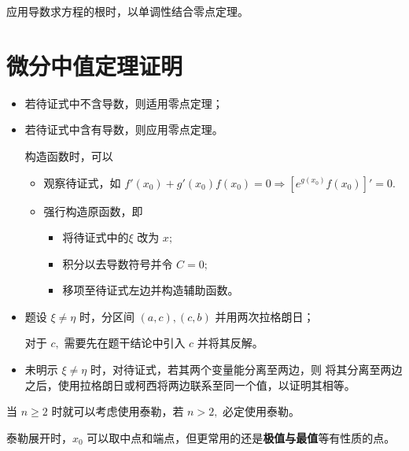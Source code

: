 应用导数求方程的根时，以单调性结合零点定理。

\section{微分中值定理证明}


\begin{itemize}
    \item 若待证式中不含导数，则适用零点定理；
    \item 若待证式中含有导数，则应用零点定理。
    
    构造函数时，可以\begin{itemize}
        \item 观察待证式，如 $ f'(x_0)+g'(x_0)f(x_0) = 0 \Rightarrow \left[e^{g(x_0)}f(x_0)\right]' = 0. $ 
        \item 强行构造原函数，即
        \begin{itemize}
            \item 将待证式中的$ \xi $ 改为 $ x; $ 
            \item 积分以去导数符号并令 $ C = 0; $ 
            \item 移项至待证式左边并构造辅助函数。
        \end{itemize}
    \end{itemize}
\end{itemize}


\begin{itemize}
    \item 题设 $ \xi\neq\eta $ 时，分区间 $ (a,c),(c,b) $ 并用两次拉格朗日；
    
    对于 $ c, $ 需要先在题干结论中引入 $ c $ 并将其反解。
    \item 未明示 $ \xi\neq\eta $ 时，对待证式，若其两个变量能分离至两边，则
    将其分离至两边之后，使用拉格朗日或柯西将两边联系至同一个值，以证明其相等。
\end{itemize}


当 $ n \geq 2 $ 时就可以考虑使用泰勒，若 $ n > 2, $ 必定使用泰勒。

泰勒展开时，$ x_0 $ 可以取中点和端点，但更常用的还是\textbf{极值与最值}等有性质的点。

